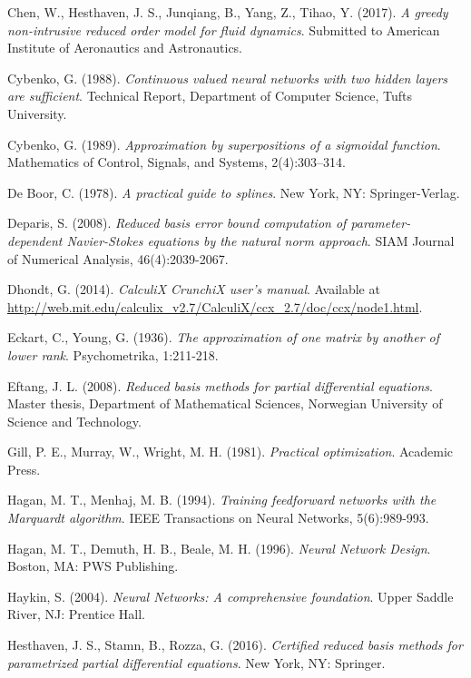 \documentclass[longtitle]{elsarticle}
\numberwithin{equation}{section}
\theoremstyle{theorem}
\theoremstyle{definition}
\theoremstyle{remark}
\theoremstyle{proposition}
\numberwithin{figure}{section}
\begin{document}
\begin{thebibliography}{50}
		Chen, W., Hesthaven, J. S., Junqiang, B., Yang, Z., Tihao, Y. (2017). \emph{A greedy non-intrusive reduced order model for fluid dynamics}. Submitted to American Institute of Aeronautics and Astronautics.
	
		Cybenko, G. (1988). \emph{Continuous valued neural networks with two hidden layers are sufficient}. Technical Report, Department of Computer Science, Tufts University.
		
		Cybenko, G. (1989). \emph{Approximation by superpositions of a sigmoidal function}. Mathematics of Control, Signals, and Systems, 2(4):303–314.
		
		De Boor, C. (1978). \emph{A practical guide to splines}. New York, NY: Springer-Verlag.
		
		Deparis, S. (2008). \emph{Reduced basis error bound computation of parameter-dependent Navier-Stokes equations by the natural norm approach}. SIAM Journal of Numerical Analysis, 46(4):2039-2067.
		
		Dhondt, G. (2014). \emph{CalculiX CrunchiX user's manual}. Available at \url{http://web.mit.edu/calculix_v2.7/CalculiX/ccx_2.7/doc/ccx/node1.html}.
		
		Eckart, C., Young, G. (1936). \emph{The approximation of one matrix by another of lower rank}. Psychometrika, 1:211-218.
		
		Eftang, J. L. (2008). \emph{Reduced basis methods for partial differential equations}. Master thesis, Department of Mathematical Sciences, Norwegian University of Science and Technology.
		
		Gill, P. E., Murray, W., Wright, M. H. (1981). \emph{Practical optimization}. Academic Press.

		Hagan, M. T., Menhaj, M. B. (1994). \emph{Training feedforward networks with the Marquardt algorithm}. IEEE Transactions on Neural Networks, 5(6):989-993.
		
		Hagan, M. T., Demuth, H. B., Beale, M. H. (1996). \emph{Neural Network Design}. Boston, MA: PWS Publishing.		

		Haykin, S. (2004). \emph{Neural Networks: A comprehensive foundation}. Upper Saddle River, NJ: Prentice Hall.
		
		Hesthaven, J. S., Stamn, B., Rozza, G. (2016). \emph{Certified reduced basis methods for parametrized partial differential equations}. New York, NY: Springer.
		

\end{thebibliography}
\end{document}

